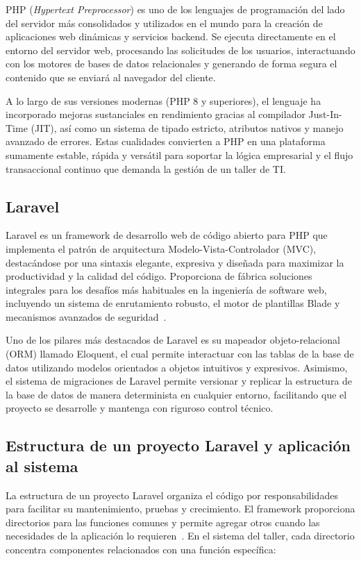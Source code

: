 PHP (\textit{Hypertext Preprocessor}) es uno de los lenguajes de programación del lado del servidor más consolidados y utilizados en el mundo para la creación de aplicaciones web dinámicas y servicios backend. Se ejecuta directamente en el entorno del servidor web, procesando las solicitudes de los usuarios, interactuando con los motores de bases de datos relacionales y generando de forma segura el contenido que se enviará al navegador del cliente.

A lo largo de sus versiones modernas (PHP 8 y superiores), el lenguaje ha incorporado mejoras sustanciales en rendimiento gracias al compilador Just-In-Time (JIT), así como un sistema de tipado estricto, atributos nativos y manejo avanzado de errores. Estas cualidades convierten a PHP en una plataforma sumamente estable, rápida y versátil para soportar la lógica empresarial y el flujo transaccional continuo que demanda la gestión de un taller de TI.

\subsection{Laravel}

Laravel es un framework de desarrollo web de código abierto para PHP que implementa el patrón de arquitectura Modelo-Vista-Controlador (MVC), destacándose por una sintaxis elegante, expresiva y diseñada para maximizar la productividad y la calidad del código. Proporciona de fábrica soluciones integrales para los desafíos más habituales en la ingeniería de software web, incluyendo un sistema de enrutamiento robusto, el motor de plantillas Blade y mecanismos avanzados de seguridad~\cite{laravel_doc}.

Uno de los pilares más destacados de Laravel es su mapeador objeto-relacional (ORM) llamado Eloquent, el cual permite interactuar con las tablas de la base de datos utilizando modelos orientados a objetos intuitivos y expresivos. Asimismo, el sistema de migraciones de Laravel permite versionar y replicar la estructura de la base de datos de manera determinista en cualquier entorno, facilitando que el proyecto se desarrolle y mantenga con riguroso control técnico.

\subsection{Estructura de un proyecto Laravel y aplicación al sistema}

La estructura de un proyecto Laravel organiza el código por responsabilidades para facilitar su mantenimiento, pruebas y crecimiento. El framework proporciona directorios para las funciones comunes y permite agregar otros cuando las necesidades de la aplicación lo requieren~\cite{laravel_doc, norvic_estructura_laravel}. En el sistema del taller, cada directorio concentra componentes relacionados con una función específica:

